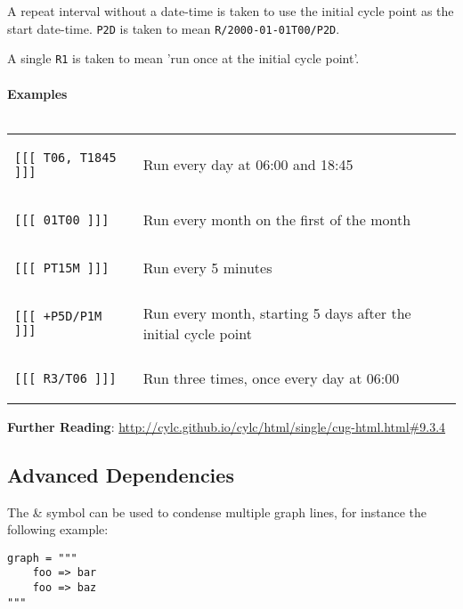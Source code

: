 A repeat interval without a date-time is taken to use the initial cycle point as the start date-time. \lstinline{P2D} is taken to mean \lstinline{R/2000-01-01T00/P2D}.

A single \lstinline{R1} is taken to mean 'run once at the initial cycle point'.

\paragraph*{Examples} $ $

\begin{tabular}{l l}
\begin{lstlisting}
[[[ T06, T1845 ]]]
\end{lstlisting}
& Run every day at 06:00 and 18:45\\
\begin{lstlisting}
[[[ 01T00 ]]]
\end{lstlisting}
& Run every month on the first of the month \\
\begin{lstlisting}
[[[ PT15M ]]]
\end{lstlisting}
& Run every 5 minutes \\
\begin{lstlisting}
[[[ +P5D/P1M ]]]
\end{lstlisting}
& Run every month, starting 5 days after the initial cycle point \\
\begin{lstlisting}
[[[ R3/T06 ]]]
\end{lstlisting}
& Run three times, once every day at 06:00
\\
\end{tabular}

\vspace{5mm}

\begin{shaded*}
\textbf{Further Reading}:
\url{http://cylc.github.io/cylc/html/single/cug-html.html#9.3.4}
\end{shaded*}


\subsection{Advanced Dependencies}

The \& symbol can be used to condense multiple graph lines, for instance the
following example:

\begin{lstlisting}
graph = """
    foo => bar
    foo => baz
"""
\end{lstlisting}

